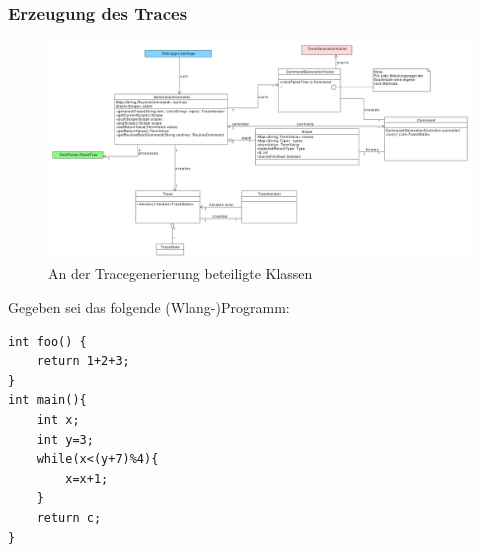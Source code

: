 \documentclass[parskip=full]{scrartcl}
\begin{document}
\subsubsection{Erzeugung des Traces}
\begin{figure}[!h]
\includegraphics[width=1.2\textwidth]{diagrammIdeenUmlet/TraceGenerationClasses.pdf}
\caption{An der Tracegenerierung beteiligte Klassen}
\label{TraceGen}
\end{figure}
Gegeben sei das folgende (Wlang-)Programm:
\begin{verbatim}
int foo() {
    return 1+2+3;
}
int main(){
    int x;
    int y=3;
    while(x<(y+7)%4){
        x=x+1;
    }
    return c;
}
\end{verbatim}
\end{document}
